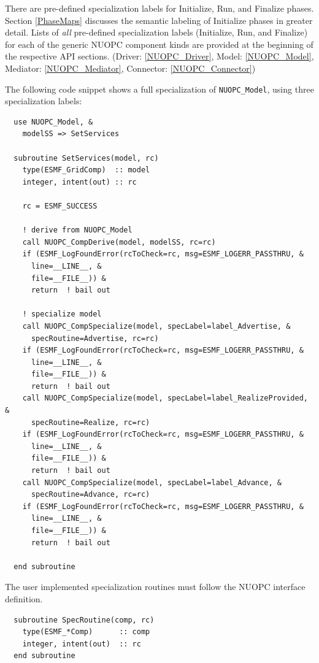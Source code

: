 There are pre-defined specialization labels for Initialize, Run, and Finalize phases. Section \ref{PhaseMaps} discusses the semantic labeling of Initialize phases in greater detail. Lists of {\em all} pre-defined specialization labels (Initialize, Run, and Finalize) for each of the generic NUOPC component kinds are provided at the beginning of the respective API sections. (Driver: \ref{NUOPC_Driver}, Model: \ref{NUOPC_Model}, Mediator: \ref{NUOPC_Mediator}, Connector: \ref{NUOPC_Connector})

The following code snippet shows a full specialization of {\tt NUOPC\_Model}, using three specialization labels:

\begin{verbatim}
  use NUOPC_Model, &
    modelSS => SetServices

  subroutine SetServices(model, rc)
    type(ESMF_GridComp)  :: model
    integer, intent(out) :: rc

    rc = ESMF_SUCCESS

    ! derive from NUOPC_Model
    call NUOPC_CompDerive(model, modelSS, rc=rc)
    if (ESMF_LogFoundError(rcToCheck=rc, msg=ESMF_LOGERR_PASSTHRU, &
      line=__LINE__, &
      file=__FILE__)) &
      return  ! bail out

    ! specialize model
    call NUOPC_CompSpecialize(model, specLabel=label_Advertise, &
      specRoutine=Advertise, rc=rc)
    if (ESMF_LogFoundError(rcToCheck=rc, msg=ESMF_LOGERR_PASSTHRU, &
      line=__LINE__, &
      file=__FILE__)) &
      return  ! bail out
    call NUOPC_CompSpecialize(model, specLabel=label_RealizeProvided, &
      specRoutine=Realize, rc=rc)
    if (ESMF_LogFoundError(rcToCheck=rc, msg=ESMF_LOGERR_PASSTHRU, &
      line=__LINE__, &
      file=__FILE__)) &
      return  ! bail out
    call NUOPC_CompSpecialize(model, specLabel=label_Advance, &
      specRoutine=Advance, rc=rc)
    if (ESMF_LogFoundError(rcToCheck=rc, msg=ESMF_LOGERR_PASSTHRU, &
      line=__LINE__, &
      file=__FILE__)) &
      return  ! bail out

  end subroutine
\end{verbatim}

The user implemented specialization routines must follow the NUOPC interface definition.

\begin{verbatim}
  subroutine SpecRoutine(comp, rc)
    type(ESMF_*Comp)      :: comp
    integer, intent(out)  :: rc
  end subroutine
\end{verbatim}

